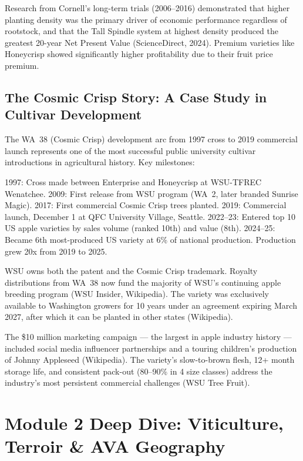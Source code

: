\documentclass[11pt,letterpaper]{article}
\begin{document}
Research from Cornell's long-term trials (2006--2016) demonstrated that higher planting density was the primary driver of economic performance regardless of rootstock, and that the Tall Spindle system at highest density produced the greatest 20-year Net Present Value (ScienceDirect, 2024). Premium varieties like Honeycrisp showed significantly higher profitability due to their fruit price premium.

\subsection{The Cosmic Crisp Story: A Case Study in Cultivar Development}

The WA~38 (Cosmic Crisp) development arc from 1997 cross to 2019 commercial launch represents one of the most successful public university cultivar introductions in agricultural history. Key milestones:

1997: Cross made between Enterprise and Honeycrisp at WSU-TFREC Wenatchee. 2009: First release from WSU program (WA~2, later branded Sunrise Magic). 2017: First commercial Cosmic Crisp trees planted. 2019: Commercial launch, December 1 at QFC University Village, Seattle. 2022--23: Entered top 10 US apple varieties by sales volume (ranked 10th) and value (8th). 2024--25: Became 6th most-produced US variety at 6\% of national production. Production grew 20x from 2019 to 2025.

WSU owns both the patent and the Cosmic Crisp trademark. Royalty distributions from WA~38 now fund the majority of WSU's continuing apple breeding program (WSU Insider, Wikipedia). The variety was exclusively available to Washington growers for 10 years under an agreement expiring March 2027, after which it can be planted in other states (Wikipedia).

The \$10 million marketing campaign --- the largest in apple industry history --- included social media influencer partnerships and a touring children's production of Johnny Appleseed (Wikipedia). The variety's slow-to-brown flesh, 12+ month storage life, and consistent pack-out (80--90\% in 4 size classes) address the industry's most persistent commercial challenges (WSU Tree Fruit).

\newpage
\section{Module 2 Deep Dive: Viticulture, Terroir \& AVA Geography}
\end{document}
